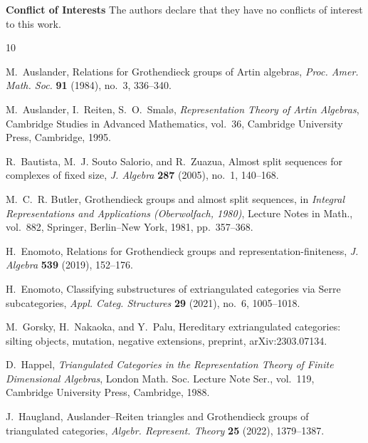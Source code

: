 \documentclass[11pt, twoside]{article}
\numberwithin{equation}{section}
\begin{document}
\hspace{-5.5mm}\textbf{Conflict of Interests}\hspace{2mm} The authors declare that they have no conflicts of interest to this work.

\vspace{3mm}

\begin{thebibliography}{10}
\addtolength{\itemsep}{-0.5em}

M.~Auslander,
\newblock Relations for {G}rothendieck groups of {A}rtin algebras,
\newblock \emph{Proc. Amer. Math. Soc.} \textbf{91} (1984), no.~3, 336--340.

M.~Auslander, I.~Reiten, S.~O.~Smal\o,
\newblock \emph{Representation Theory of Artin Algebras},
\newblock Cambridge Studies in Advanced Mathematics, vol.~36, Cambridge
  University Press, Cambridge, 1995.

R.~Bautista, M.~J. Souto Salorio, and R.~Zuazua,
\newblock Almost split sequences for complexes of fixed size,
\newblock \emph{J. Algebra} \textbf{287} (2005), no.~1, 140--168.

M.~C.~R. Butler,
\newblock Grothendieck groups and almost split sequences,
\newblock in \emph{Integral Representations and Applications (Oberwolfach,
  1980)}, Lecture Notes in Math., vol.~882, Springer, Berlin--New York, 1981,
  pp.~357--368.

H.~Enomoto,
\newblock Relations for {G}rothendieck groups and representation-finiteness,
\newblock \emph{J. Algebra} \textbf{539} (2019), 152--176.

H.~Enomoto,
\newblock Classifying substructures of extriangulated categories via {S}erre subcategories,
\newblock \emph{Appl. Categ. Structures} \textbf{29} (2021), no.~6, 1005--1018.

M.~Gorsky, H.~Nakaoka, and Y.~Palu,
\newblock Hereditary extriangulated categories: silting objects, mutation,
  negative extensions,
\newblock preprint, arXiv:2303.07134.

D.~Happel,
\newblock \emph{Triangulated Categories in the Representation Theory of
  Finite Dimensional Algebras},
\newblock London Math. Soc. Lecture Note Ser., vol.~119, Cambridge University
  Press, Cambridge, 1988.

J.~Haugland,
\newblock Auslander--Reiten triangles and {G}rothendieck groups of
  triangulated categories,
\newblock \emph{Algebr. Represent. Theory} \textbf{25} (2022), 1379--1387.


\end{thebibliography}
\end{document}
